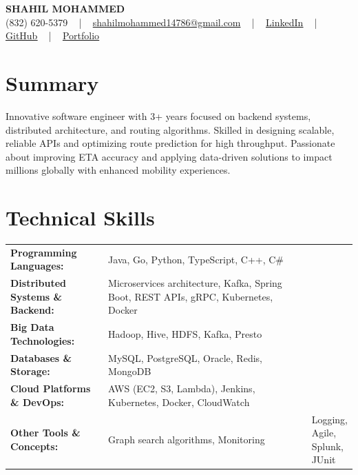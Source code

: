 \documentclass[letterpaper,11pt]{article}
\begin{document}
\begin{center}
    {\fontsize{14pt}{12pt}\selectfont \textbf{\MakeUppercase{Shahil Mohammed}}}\\ \vspace{2pt}
    \fontsize{10pt}{12pt}\selectfont (832) 620-5379 ~ | ~ \href{mailto:shahilmohammed14786@gmail.com}{shahilmohammed14786@gmail.com} ~ | ~  
    \href{https://www.linkedin.com/in/shahil-mohammed-9652931a1/}{\color{blue}\underline{LinkedIn}}  ~ | ~ 
    \href{https://github.com/freakbeast14}{\color{blue}\underline{GitHub}} ~ | ~ 
    \href{https://shahil-mohammed.netlify.app/}{\color{blue}\underline{Portfolio}}
    \vspace{-8pt}
\end{center}

\section{Summary}
\fontsize{9pt}{10pt}\selectfont
Innovative software engineer with 3+ years focused on backend systems, distributed architecture, and routing algorithms. Skilled in designing scalable, reliable APIs and optimizing route prediction for high throughput. Passionate about improving ETA accuracy and applying data-driven solutions to impact millions globally with enhanced mobility experiences.
 \vspace{-5pt}
 
\section{Technical Skills}
        \vspace{-14pt}
        \begin{table}[h]
            \fontsize{9pt}{10pt}\selectfont
            \begin{tabular}{p{0.3\linewidth} p{0.7\linewidth}}
                \textbf{Programming Languages:} & Java, Go, Python, TypeScript, C++, C\# \\
                \textbf{Distributed Systems \& Backend:} & Microservices architecture, Kafka, Spring Boot, REST APIs, gRPC, Kubernetes, Docker \\
                \textbf{Big Data Technologies:} & Hadoop, Hive, HDFS, Kafka, Presto \\
                \textbf{Databases \& Storage:} & MySQL, PostgreSQL, Oracle, Redis, MongoDB \\
                \textbf{Cloud Platforms \& DevOps:} & AWS (EC2, S3, Lambda), Jenkins, Kubernetes, Docker, CloudWatch \\
                \textbf{Other Tools \& Concepts:} & Graph search algorithms, Monitoring & Logging, Agile, Splunk, JUnit \\
            \end{tabular}
        \end{table}
 \vspace{-15pt}
 
\end{document}
